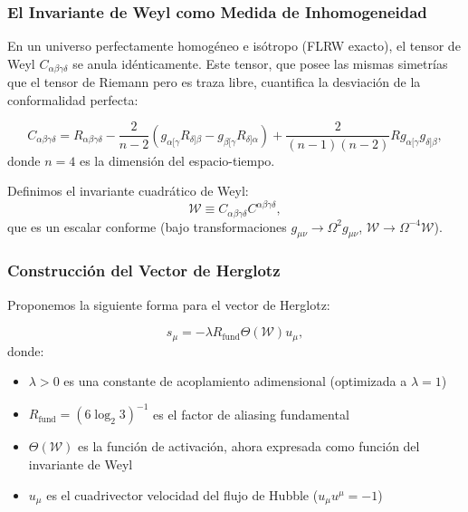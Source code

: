 \documentclass[12pt, a4paper]{article}
\theoremstyle{plain}
\theoremstyle{definition}
\begin{document}
\subsubsection{El Invariante de Weyl como Medida de Inhomogeneidad}

En un universo perfectamente homogéneo e isótropo (FLRW exacto), el tensor de Weyl $C_{\alpha\beta\gamma\delta}$ se anula idénticamente. Este tensor, que posee las mismas simetrías que el tensor de Riemann pero es traza libre, cuantifica la desviación de la conformalidad perfecta:

\begin{equation}
C_{\alpha\beta\gamma\delta} = R_{\alpha\beta\gamma\delta} - \frac{2}{n-2}(g_{\alpha[\gamma}R_{\delta]\beta} - g_{\beta[\gamma}R_{\delta]\alpha}) + \frac{2}{(n-1)(n-2)}R g_{\alpha[\gamma}g_{\delta]\beta},
\end{equation}
donde $n=4$ es la dimensión del espacio-tiempo.

Definimos el invariante cuadrático de Weyl:
\begin{equation}
\mathcal{W} \equiv C_{\alpha\beta\gamma\delta}C^{\alpha\beta\gamma\delta},
\label{eq:weyl_invariant}
\end{equation}
que es un escalar conforme (bajo transformaciones $g_{\mu\nu} \to \Omega^2 g_{\mu\nu}$, $\mathcal{W} \to \Omega^{-4}\mathcal{W}$).

\subsubsection{Construcción del Vector de Herglotz}

Proponemos la siguiente forma para el vector de Herglotz:

\begin{equation}
s_\mu = -\lambda R_{\text{fund}} \Theta(\mathcal{W}) u_\mu,
\label{eq:herglotz_vector}
\end{equation}
donde:
\begin{itemize}
    \item $\lambda > 0$ es una constante de acoplamiento adimensional (optimizada a $\lambda = 1$)
    \item $R_{\text{fund}} = (6\log_2 3)^{-1}$ es el factor de aliasing fundamental
    \item $\Theta(\mathcal{W})$ es la función de activación, ahora expresada como función del invariante de Weyl
    \item $u_\mu$ es el cuadrivector velocidad del flujo de Hubble ($u_\mu u^\mu = -1$)
\end{itemize}
\end{document}
